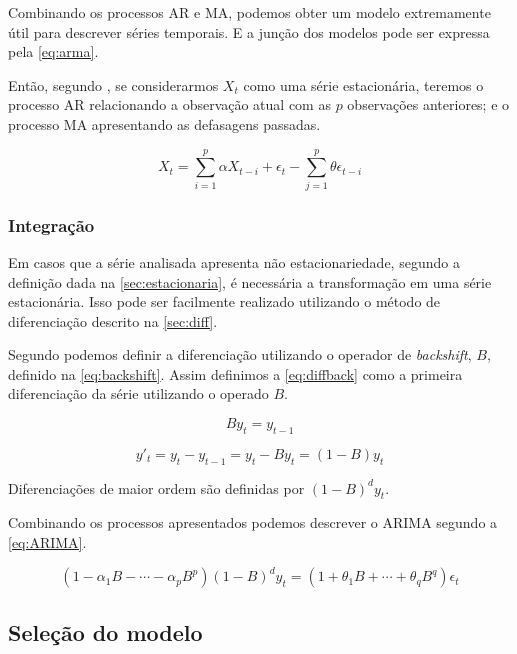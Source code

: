 \documentclass[
    12pt,
    oneside,
    a4paper,
    english,
    brazil
]{abntex2}
\begin{document}
Combinando os processos AR e MA, podemos obter um modelo extremamente útil para
descrever  séries temporais.  E a  junção dos  modelos pode  ser expressa  pela
\autoref{eq:arma}.

Então, segundo , se  considerarmos $X_t$ como uma
série estacionária, teremos  o processo AR relacionando a  observação atual com
as  $p$ observações  anteriores; e  o  processo MA  apresentando as  defasagens
passadas.

\begin{equation}
    \label{eq:arma}
    X_t = \sum_{i = 1}^{p}{\alpha X_{t-i}} + \epsilon_t - \sum_{j = 1}^{p}{\theta \epsilon_{t-i}}
\end{equation}

\subsubsection{Integração}

Em  casos  que a  série  analisada  apresenta  não estacionariedade, segundo  a
definição dada  na \autoref{sec:estacionaria}, é necessária  a transformação em
uma série estacionária. Isso pode  ser facilmente realizado utilizando o método
de  diferenciação  descrito na  \autoref{sec:diff}.

Segundo  podemos definir  a diferenciação utilizando o operador
de \textit{backshift}, $B$, definido na \autoref{eq:backshift}. Assim definimos
a \autoref{eq:diffback}  como a  primeira diferenciação  da série  utilizando o
operado $B$.

\begin{equation}
    \label{eq:backshift}
    By_t = y_{t-1}
\end{equation}

\begin{equation}
    \label{eq:diffback}
    y'_t = y_t - y_{t-1} = y_t - By_t = (1-B)y_t
\end{equation}

Diferenciações de maior ordem são definidas por $(1-B)^dy_t$.

Combinando  os  processos apresentados  podemos  descrever  o ARIMA  segundo  a
\autoref{eq:ARIMA}.

\begin{equation}
    \label{eq:ARIMA}
    (1 - \alpha_1B-\cdots-\alpha_pB^p)(1-B)^dy_t=(1+\theta_1B+\cdots+\theta_qB^q)\epsilon_t
\end{equation}

\subsection{Seleção do modelo}
\end{document}

